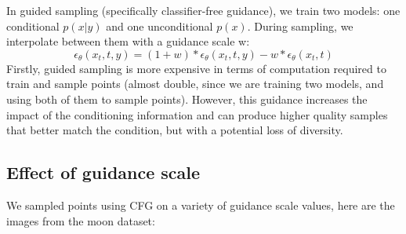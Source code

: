 \documentclass[a4paper,12pt]{article}
\begin{document}
In guided sampling (specifically classifier-free guidance), we train two models: one conditional $p(x|y)$ and one unconditional $p(x)$. During sampling, we interpolate between them with a guidance scale w:
\[\epsilon_\theta(x_t, t, y) = (1+w) * \epsilon_\theta(x_t, t, y) - w * \epsilon_\theta(x_t, t)\]
Firstly, guided sampling is more expensive in terms of computation required to train and sample points (almost double, since we are training two models, and using both of them to sample points). However, this guidance increases the impact of the conditioning information and can produce higher quality samples that better match the condition, but with a potential loss of diversity.

\subsection*{Effect of guidance scale}
We sampled points using CFG on a variety of guidance scale values, here are the images from the moon dataset:
\end{document}
